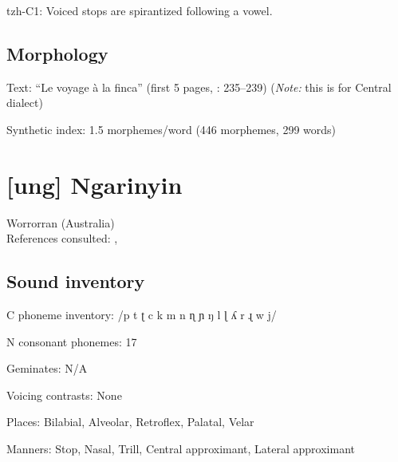 {\begin{appendixdesc}
\item[tzh-C1:] Voiced stops are spirantized following a vowel. \citep[11]{Kaufman1971}
\end{appendixdesc}
\subsection*{Morphology}

\begin{appendixdesc}

\item[Text:] “Le voyage à la finca” (first 5 pages, \citealt{Polian2006}: 235--239) (\textit{Note:} this is for Central dialect)

\item[Synthetic index:] 1.5 morphemes/word (446 morphemes, 299 words)
\end{appendixdesc}
\section*{[ung] Ngarinyin}  %
Worrorran (Australia)\medskip\\
References consulted: \citet{CoateOates1970}, \citet{Rumsey1978}

\subsection*{Sound inventory}
\begin{appendixdesc}

\item[C phoneme inventory:] /p t ʈ c k m n ɳ ɲ ŋ l ɭ ʎ r ɻ w j/

\item[N consonant phonemes:] 17

\item[Geminates:] N/A

\item[Voicing contrasts:] None

\item[Places:] Bilabial, Alveolar, Retroflex, Palatal, Velar

\item[Manners:] Stop, Nasal, Trill, Central approximant, Lateral approximant


\end{appendixdesc}}
